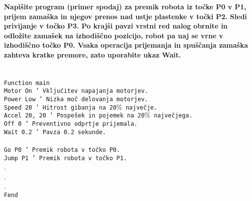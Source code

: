 \begin{mdframed}[backgroundcolor=green!20, shadow=true,roundcorner=8pt]
        \vspace{0.2cm}
\noindent %
\textbf{Napišite program (primer spodaj) za premik robota iz točke P0 v P1, prijem zamaška in njegov prenos nad ustje plastenke v točki P2. Sledi privijanje v točko P3. Po krajši pavzi vrstni red nalog obrnite in odložite zamašek na izhodiščno pozicijo, robot pa naj se vrne v izhodiščno točko P0. Vsaka operacija prijemanja in spuščanja zamaška zahteva kratke premore, zato uporabite ukaz Wait.} \\ %
\\
\\
\small
\texttt{Function main} \\%
    \hspace*{0.3cm}   \texttt{Motor On        \small\hspace{0.75cm} ' Vključitev napajanja motorjev.} \\%
    \hspace*{0.3cm}   \texttt{Power Low       \small\hspace{0.55cm} ' Nizka moč delovanja motorjev.} \\%
    \hspace*{0.3cm}   \texttt{Speed 20        \small\hspace{0.75cm} ' Hitrost gibanja na 20$\%$ največje.} \\%
    \hspace*{0.3cm}   \texttt{Accel 20, 20    \small\hspace{0.00cm} ' Pospešek in pojemek na 20$\%$ največjega.} \\%
    \hspace*{0.3cm}   \texttt{Off 0           \small\hspace{1.35cm} ' Preventivno odprtje prijemala.} \\%
    \hspace*{0.3cm}   \texttt{Wait 0.2        \small\hspace{0.80cm} ' Pavza 0.2 sekunde.} \\%
     \\%
    \hspace*{0.3cm}   \texttt{Go P0           \small\hspace{1.40cm} ' Premik robota v točko P0.} \\%
    \hspace*{0.3cm}   \texttt{Jump P1         \small\hspace{1.00cm} ' Premik robota v točko P1.} \\%
    \hspace*{0.3cm}   . \\%
    \hspace*{0.3cm}   . \\%
    \hspace*{0.3cm}   . \\%
\texttt{Fend} \\%
\normalsize


\end{mdframed}
